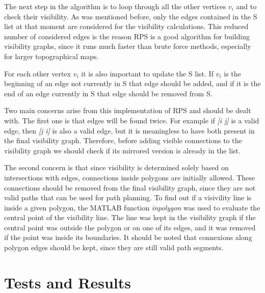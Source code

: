\documentclass[journal]{IEEEtran}
\begin{document}
The next step in the algorithm is to loop through all the other vertices $v_i$ and to check their visibility. As was mentioned before, only the edges contained in the S list at that moment are considered for the visibility calculations. This reduced number of considered edges is the reason RPS is a good algorithm for building visibility graphs, since it runs much faster than brute force methods, especially for larger topographical maps.

For each other vertex $v_i$ it is also important to update the S list. If $v_i$ is the beginning of an edge not currently in S that edge should be added, and if it is the end of an edge currently in S that edge should be removed from S.

Two main concerns arise from this implementation of RPS and should be dealt with. The first one is that edges will be found twice. For example if \textit{[i j]} is a valid edge, then \textit{[j i]} is also a valid edge, but it is meaningless to have both present in the final visibility graph. Therefore, before adding visible connections to the visibility graph we should check if its mirrored version is already in the list.

The second concern is that since visibility is determined solely based on intersections with edges, connections inside polygons are initially allowed. These connections should be removed from the final visibility graph, since they are not valid paths that can be used for path planning. To find out if a visivility line is inside a given polygon, the MATLAB function \textit{inpolygon} was used to evaluate the central point of the visibility line. The line was kept in the visibility graph if the central point was outside the polygon or on one of its edges, and it was removed if the point was inside its boundaries. It should be noted that connexions along polygon edges should be kept, since they are still valid path segments.












\section{Tests and Results}\label{results}
\end{document}
